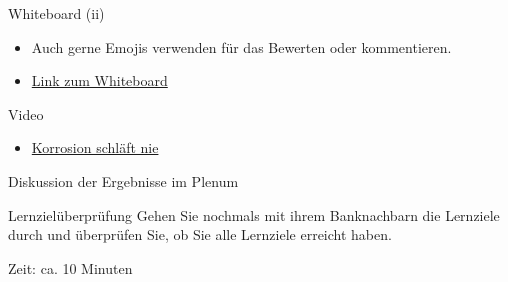 \begin{frame}{Whiteboard (ii)}

    \begin{itemize}
        \item[\textbullet] Auch gerne Emojis verwenden für das Bewerten oder kommentieren.
        \item[\textbullet] \href{https://schweizerischebau-my.sharepoint.com/:wb:/g/personal/pfaendler_bauschule_ch/Ef9LEc4sPxROojf2Lq036s4BVeLmop9F0z6RdOGjloxprQ?e=k0avJg}{Link zum Whiteboard}
    \end{itemize}

\end{frame}


\begin{frame}{Video}
    \begin{itemize}
        \item \href{https://www.youtube.com/watch?v=h2Ez8dJto9s}{Korrosion schläft nie}
    \end{itemize}
\end{frame}


\begin{frame}{Diskussion der Ergebnisse im Plenum}

\end{frame}


\begin{frame}{Lernzielüberprüfung}
Gehen Sie nochmals mit ihrem Banknachbarn die Lernziele durch und überprüfen Sie, ob Sie alle Lernziele erreicht haben.

Zeit: ca. 10 Minuten
\end{frame}


